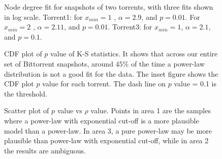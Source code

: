 \documentclass[10pt,conference,letterpaper,final]{IEEEtran}
\begin{document}
\begin{figure}
\centering
{}
\caption{Node degree fit for snapshots of two torrents, with three fits shown in log scale. Torrent1: for $x_{min}=1$ , $\alpha = 2.9$, and $p=0.01$. For $x_{min}=2$ , $\alpha = 2.11$, and $p = 0.01$. Torrent3: for $x_{min}=1$, $\alpha = 2.1$, and $p = 0.1$. }
\label{fig:fitting}
\vspace{-2mm}
\end{figure}

\begin{figure}
\centering
\caption{CDF plot of $p$ value of K-S statistics. It shows that across our entire set of Bittorrent snapshots, around $45\%$ of the time a power-law distribution is not a good fit for the data. 
The inset figure shows the CDF plot $p$ value for each torrent. The dash line on $p$ value = 0.1 is the threshold.} 
\label{fig:cdf-p}
\vspace{-2mm}
\end{figure}




\begin{figure}
\centering
{}
\caption{Scatter plot of $p$ value vs $\rho$ value. 
	Points in area 1 are the samples where a power-law with exponential cut-off is a more plausible model than a power-law.
	In area 3, a pure power-law may be more plausible than power-law with exponential cut-off, while in area 2 the results are ambiguous.} 
\label{fig:scatter-pvalue-vs-rho}
\vspace{-2mm}
\end{figure}
\end{document}
